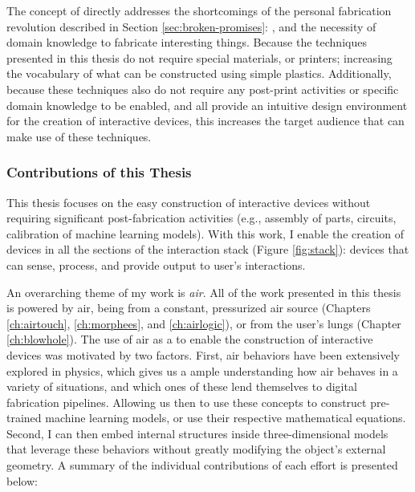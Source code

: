       The concept of \papf directly addresses the shortcomings of the personal
      fabrication revolution described in Section \ref{sec:broken-promises}:
      , and the necessity of
      domain knowledge to fabricate interesting things. Because the techniques
      presented in this thesis do not require special materials, or printers;
      increasing the vocabulary of what can be constructed using simple
      plastics. Additionally, because these techniques also do not require any
      post-print activities or specific domain knowledge to be enabled, and all
      provide an intuitive design environment for the creation of interactive
      devices, this increases the target audience that can make use of these
      techniques.

      \subsubsection*{Contributions of this Thesis}
        This thesis focuses on the easy construction of interactive devices
        without requiring significant post-fabrication activities (e.g.,
        assembly of parts, circuits, calibration of machine learning models).
        With this work, I enable the creation of devices in all the sections of
        the interaction stack (Figure \ref{fig:stack}): devices that can sense,
        process, and provide output to user's interactions.

        An overarching theme of my work is \emph{air}. All of the work presented
        in this thesis is powered by air, being from a constant, pressurized air
        source (Chapters \ref{ch:airtouch}, \ref{ch:morphees}, and
        \ref{ch:airlogic}), or from the user's lungs (Chapter
        \ref{ch:blowhole}). The use of air as a  to enable the
        construction of interactive devices was motivated by two factors. First,
        air behaviors have been extensively explored in physics, which gives
        us a ample understanding how air behaves in a variety of situations, and
        which ones of these lend themselves to digital fabrication pipelines.
        Allowing us then to use these concepts to construct pre-trained machine
        learning models, or use their respective mathematical equations. Second,
        I can then embed internal structures inside three-dimensional models
        that leverage these behaviors without greatly modifying the object's
        external geometry. A summary of the individual contributions of each
        effort is presented below:

